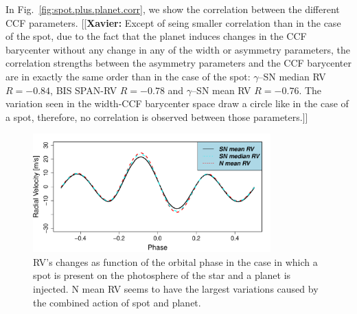 \documentclass{aa}
\newcommand{\xavier}[1]{{\color{blue}[[\textbf{Xavier: }#1]]}}
\begin{document}
In Fig.~\ref{fig:spot.plus.planet.corr}, we show the correlation between the different CCF parameters. \xavier{Except of seing smaller correlation than in the case of the spot, due to the fact that the planet induces changes in the CCF barycenter without any change in any of the width or asymmetry parameters, the correlation strengths between the asymmetry parameters and the CCF barycenter are in exactly the same order than in the case of the spot: $\gamma$--SN median RV $R=-0.84$, BIS SPAN-RV $R=-0.78$ and $\gamma$--SN mean RV $R=-0.76$. The variation seen in the width-CCF barycenter space draw a circle like in the case of a spot, therefore, no correlation is observed between those parameters.}

\begin{figure}[htbp]
\begin{center}
\includegraphics[width = 3.6in]{RV_comparison_SPOT_PLANET.pdf} 
 \caption{RV's changes as function of the orbital phase in the case in which a spot is present on the photosphere of the star and a planet is injected. N mean RV seems to have the largest variations caused by the combined action of spot and planet.}
    \label{fig:spot.plus.planet}
\end{center}
\end{figure}
\end{document}
